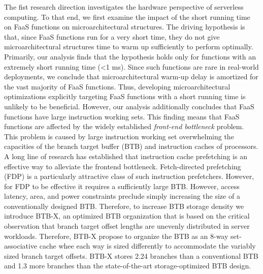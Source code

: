\documentclass[../main.tex]{subfiles}
\begin{document}
The fist research direction investigates the hardware perspective of
serverless computing. To that end, we first examine the impact of the
short running time on FaaS functions on microarchitectural
structures. The driving hypothesis is that, since FaaS functions run
for a very short time, they do not give microarchitectural structures
time to warm up sufficiently to perform optimally. Primarily, our
analysis finds that the hypothesis holds only for functions with an
extremely short running time (<1 ms). Since such functions are rare in
real-world deployments, we conclude that microarchitectural warm-up
delay is amortized for the vast majority of FaaS functions. Thus,
developing microarchitectural optimizations explicitly targeting FaaS
functions with a short running time is unlikely to be
beneficial. However, our analysis additionally concludes that
FaaS functions have large instruction working sets. This finding
means that FaaS functions are affected by the widely established
\emph{front-end bottleneck} problem. This problem is caused by large
instruction working set overwhelming the capacities of the branch
target buffer (BTB) and instruction caches of processors. A long line
of research has established that instruction cache prefetching is an
effective way to alleviate the frontend bottleneck. Fetch-directed
prefetching (FDP) is a particularly attractive class of such
instruction prefetchers. However, for FDP to be effective it requires
a sufficiently large BTB. However, access latency, area, and power
constraints preclude simply increasing the size of a conventionally
designed BTB. Therefore, to increase BTB storage density we introduce
BTB-X, an optimized BTB organization that is based on the critical
observation that branch target offset lengths are unevenly distributed
in server workloads. Therefore, BTB-X propose to organize the BTB as
an 8-way set-associative cache whee each way is sized differently to
accommodate the variably sized branch target offsets. BTB-X stores
2.24\texttimes{} branches than a conventional BTB and 1.3\texttimes{}
more branches than the state-of-the-art storage-optimized BTB design.
\end{document}
